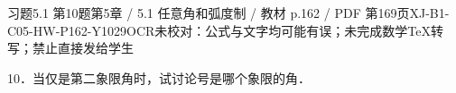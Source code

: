 \begin{bankitem}{习题5.1 第10题}{第5章 / 5.1 任意角和弧度制 / 教材 p.162 / PDF 第169页}{XJ-B1-C05-HW-P162-Y1029}{OCR未校对：公式与文字均可能有误；未完成数学TeX转写；禁止直接发给学生}
\begin{ocrdraft}
\par
10．当仅是第二象限角时，试讨论号是哪个象限的角．
\end{ocrdraft}
\end{bankitem}
